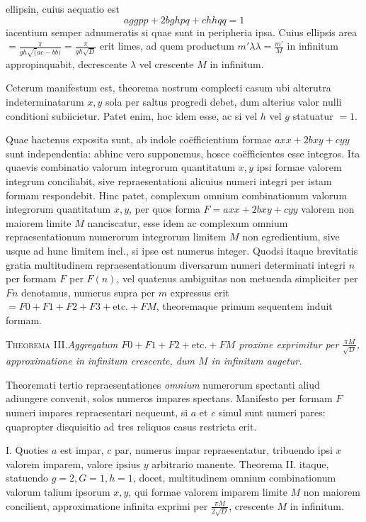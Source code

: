 %
ellipsin, cuius aequatio est
\[
aggpp+2bghpq+chhqq=1
\]
iacentium semper adnumeratis si quae sunt in peripheria ipsa. Cuius ellipsis area $=\frac\pi{gh\surd(ac-bb)}=\frac\pi{gh\surd D}$ erit limes, ad quem productum $m'\lambda\lambda=\frac{m'}M$ in infinitum appropinquabit, decrescente $\lambda$ vel crescente $M$ in infinitum.

Ceterum manifestum est, theorema nostrum complecti casum ubi alterutra indeterminatarum $x,y$ sola per saltus progredi debet, dum alterius valor nulli conditioni subiicietur. Patet enim, hoc idem esse, ac si vel $h$ vel $g$ statuatur $=1$.

Quae hactenus exposita sunt, ab indole coëfficientium formae $axx+2bxy+cyy$ sunt independentia: abhinc vero supponemus, hosce coëfficientes esse integros. Ita quaevis combinatio valorum integrorum quantitatum $x,y$ ipsi formae valorem integrum conciliabit, sive repraesentationi alicuius numeri integri per istam formam respondebit. Hinc patet, complexum omnium combinationum valorum integrorum quantitatum $x,y$, per quos forma $F=axx+2bxy+cyy$ valorem non maiorem limite $M$ nanciscatur, esse idem ac complexum omnium repraesentationum numerorum integrorum limitem $M$ non egredientium, sive usque ad hunc limitem incl., si ipse est numerus integer. Quodsi itaque brevitatis gratia multitudinem repraesentationum diversarum numeri determinati integri $n$ per formam $F$ per $F(n)$, vel quatenus ambiguitas non metuenda simpliciter per $Fn$ denotamus, numerus supra per $m$ expressus erit $=F0+F1+F2+F3+\text{etc.}+FM$, theoremaque primum sequentem induit formam.

\textsc{Theorema III.}\quad\emph{Aggregatum $F0+F1+F2+\text{etc.}+FM$ proxime exprimitur per $\frac{\pi M}{\surd D}$, approximatione in infinitum crescente, dum $M$ in infinitum augetur.}

Theoremati tertio repraesentationes \emph{omnium} numerorum spectanti aliud adiungere convenit, solos numeros impares spectans. Manifesto per formam $F$ numeri impares repraesentari nequeunt, si $a$ et $c$ simul sunt numeri pares: quapropter disquisitio ad tres reliquos casus restricta erit.

I. Quoties $a$ est impar, $c$ par, numerus impar repraesentatur, tribuendo ipsi $x$ valorem imparem, valore ipsius $y$ arbitrario manente. Theorema II. 
%
itaque, statuendo $g=2,G=1,h=1$, docet, multitudinem omnium combinationum valorum talium ipsorum $x,y$, qui formae valorem imparem limite $M$ non maiorem concilient, approximatione infinita exprimi per $\frac{\pi M}{2\surd D}$, crescente $M$ in infinitum.

